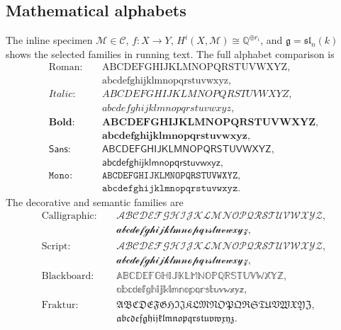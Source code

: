 \documentclass[sectionlevel=book,status=draft]{noteformyself}
\begin{document}
\subsection[
  short-title={Mathematical type families},
  status=published,
  tag=0ABCDS2,
  label=\labelNFM{subsec:math-specimen}
]{Mathematical alphabets}

The inline specimen
\(\mathcal{M}\in\mathscr{C}\), \(f\colon X\to Y\),
\(H^i(X,\mathcal{M})\cong\mathbb{Q}^{\oplus r_i}\), and
\(\mathfrak{g}=\mathfrak{sl}_n(k)\)
shows the selected families in running text. The full alphabet comparison is
\[
\begin{aligned}
  \mathrm{Roman:}\quad
    &\mathrm{ABCDEFGHIJKLMNOPQRSTUVWXYZ},\\
    &\mathrm{abcdefghijklmnopqrstuvwxyz},\\
  \mathit{Italic:}\quad
    &\mathit{ABCDEFGHIJKLMNOPQRSTUVWXYZ},\\
    &\mathit{abcdefghijklmnopqrstuvwxyz},\\
  \mathbf{Bold:}\quad
    &\mathbf{ABCDEFGHIJKLMNOPQRSTUVWXYZ},\\
    &\mathbf{abcdefghijklmnopqrstuvwxyz},\\
  \mathsf{Sans:}\quad
    &\mathsf{ABCDEFGHIJKLMNOPQRSTUVWXYZ},\\
    &\mathsf{abcdefghijklmnopqrstuvwxyz},\\
  \mathtt{Mono:}\quad
    &\mathtt{ABCDEFGHIJKLMNOPQRSTUVWXYZ},\\
    &\mathtt{abcdefghijklmnopqrstuvwxyz}.
\end{aligned}
\]
The decorative and semantic families are
\[
\begin{aligned}
  \mathrm{Calligraphic:}\quad
    &\mathcal{ABCDEFGHIJKLMNOPQRSTUVWXYZ},\\
    &\mathcal{abcdefghijklmnopqrstuvwxyz},\\
  \mathrm{Script:}\quad
    &\mathscr{ABCDEFGHIJKLMNOPQRSTUVWXYZ},\\
    &\mathscr{abcdefghijklmnopqrstuvwxyz},\\
  \mathrm{Blackboard:}\quad
    &\mathbb{ABCDEFGHIJKLMNOPQRSTUVWXYZ},\\
    &\mathbb{abcdefghijklmnopqrstuvwxyz},\\
  \mathrm{Fraktur:}\quad
    &\mathfrak{ABCDEFGHIJKLMNOPQRSTUVWXYZ},\\
    &\mathfrak{abcdefghijklmnopqrstuvwxyz}.
\end{aligned}
\]

\end{document}

